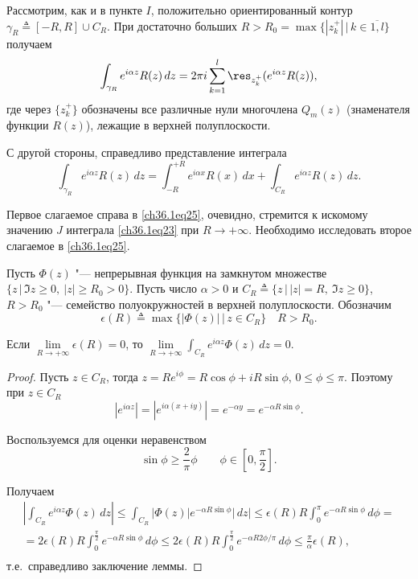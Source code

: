 Рассмотрим, как и в пункте $I$, положительно ориентированный контур $\gamma_R \triangleq [-R,R] \cup C_R$. При достаточно больших $R > R_0 = \max \{ |z_k^+| \,\big|\, k \in \overline{1,l} \}$ получаем
\begin{equation} \label{ch36.1eq24}
\int_{\gamma_R} e^{i \alpha z}R(z) \,dz = 2\pi i \sum_{k = 1}^l \res_{z_k^+} (e^{i\alpha z}R(z)),
\end{equation}
где через $\{ z_k^+ \}$ обозначены все различные нули многочлена $Q_m(z)$ (знаменателя функции $R(z)$), лежащие в верхней полуплоскости.

С другой стороны, справедливо представление интеграла 
\begin{equation} \label{ch36.1eq25}
\int_{\gamma_R} e^{i \alpha z}R(z)\,dz = \int_{-R}^{+R} e^{i \alpha x}R(x)\,dx + \int_{C_R} e^{i \alpha z} R(z)\,dz.
\end{equation}

Первое слагаемое справа в \eqref{ch36.1eq25}, очевидно, стремится к искомому значению $J$ интеграла \eqref{ch36.1eq23} при $R \to +\infty$. Необходимо исследовать второе слагаемое в \eqref{ch36.1eq25}.

\begin{lemm}  \label{ch36.1lemm5}
Пусть $\Phi(z)$ "--- непрерывная функция на замкнутом множестве $\{ z \, \big| \, \Im z \ge 0,\ |z| \ge R_0 > 0 \}$. Пусть число $\alpha > 0$ и $C_R \triangleq \{ z \, \big| \, |z| = R, \ \Im z \ge 0 \}$,  $R > R_0$ "--- семейство полуокружностей в верхней полуплоскости. Обозначим
$$
\epsilon(R) \triangleq \max \{ |\Phi(z)| \, \big| \, z \in C_R \} \quad R > R_0.
$$

Если $\lim\limits_{R \to +\infty} \epsilon(R) = 0$, то $\lim\limits_{R \to +\infty} \int_{C_R} e^{i \alpha z} \Phi(z) \,dz = 0$.
\end{lemm}

\begin{proof}
Пусть $z \in C_R$, тогда $z = Re^{i\phi} = R\cos\phi + iR\sin\phi$, $ 0 \le \phi \le \pi$. Поэтому при $z \in C_R$
$$
|e^{i \alpha z}| = |e^{i \alpha(x + iy)}| = e^{-\alpha y} = e^{- \alpha R \sin\phi}.
$$

Воспользуемся для оценки неравенством
\begin{equation} \label{ch36.1eq26}
\sin \phi \ge \frac{2}{\pi}\phi \quad \text{} \quad \phi \in \left[ 0, \frac{\pi}{2}\right].
\end{equation}

Получаем
\begin{multline*}
\left| \int_{C_R} e^{i \alpha z} \Phi(z)\,dz \right| \le \int_{C_R} |\Phi(z)|e^{-\alpha R \sin \phi}|\,dz| \le \epsilon(R)R \int_0^\pi e^{-\alpha R \sin\phi} \,d\phi =\\= 2\epsilon(R)R \int_0^{\frac{\pi}{2}} e^{-\alpha R \sin\phi} \,d\phi \le 2\epsilon(R)R \int_0^{\frac{\pi}{2}} e^{-\alpha R 2\phi / \pi} \,d\phi \le \frac{\pi}{\alpha} \epsilon(R),\\
\end{multline*}
т.е.~справедливо заключение леммы.
\end{proof}

